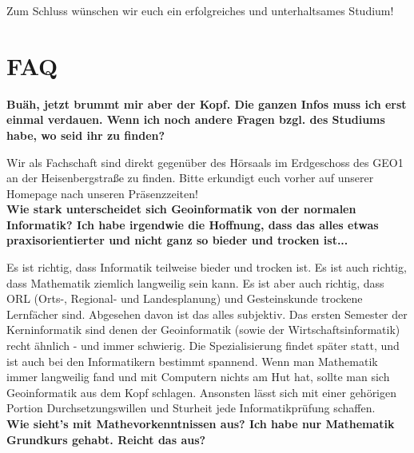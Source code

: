 Zum Schluss wünschen wir euch ein erfolgreiches und unterhaltsames Studium!

\newpage

\section*{FAQ} %
\textbf{Buäh, jetzt brummt mir aber der Kopf. Die ganzen Infos muss ich erst einmal verdauen. Wenn ich noch andere Fragen bzgl. des Studiums habe, wo seid ihr zu finden?}

Wir als Fachschaft sind direkt gegenüber des Hörsaals im Erdgeschoss des GEO1 an der Heisenbergstraße zu finden. Bitte erkundigt euch vorher auf unserer Homepage nach unseren Präsenzzeiten!\\



\textbf{Wie stark unterscheidet sich Geoinformatik von der normalen Informatik? Ich habe irgendwie die Hoffnung, dass das alles etwas praxisorientierter und nicht ganz so bieder und trocken ist...}
 
Es ist richtig, dass Informatik teilweise bieder und trocken ist. Es ist auch richtig, dass Mathematik ziemlich langweilig sein kann. Es ist aber auch richtig, dass ORL (Orts-, Regional- und Landesplanung) und Gesteinskunde trockene Lernfächer sind. Abgesehen davon ist das alles subjektiv. Das ersten Semester der Kerninformatik sind denen der Geoinformatik (sowie der Wirtschaftsinformatik) recht ähnlich - und immer schwierig. Die Spezialisierung ﬁndet später statt, und ist auch bei den Informatikern bestimmt spannend. Wenn man Mathematik immer langweilig fand und mit Computern nichts am Hut hat, sollte man sich Geoinformatik aus dem Kopf schlagen. Ansonsten lässt sich mit einer gehörigen Portion Durchsetzungswillen und Sturheit jede Informatikprüfung schaffen.\\

\textbf{Wie sieht's mit Mathevorkenntnissen aus? Ich habe nur Mathematik Grundkurs gehabt. Reicht das aus?}

